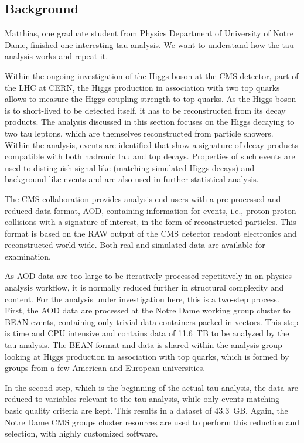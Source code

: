 \documentclass{acm_proc_article-sp}
\begin{document}
\subsection{Background}
Matthias, one graduate student from Physics Department of University of Notre Dame, finished one interesting tau analysis. We want to understand how the tau analysis works and repeat it. 

Within the ongoing investigation of the Higgs boson at the CMS
detector, part of the LHC at CERN, the Higgs production in association
with two top quarks allows to measure the Higgs coupling strength to
top quarks.  As the Higgs boson is to short-lived to be detected
itself, it has to be reconstructed from its decay products.  The
analysis discussed in this section focuses on the Higgs decaying to
two tau leptons, which are themselves reconstructed from particle
showers.  Within the analysis, events are identified that show a
signature of decay products compatible with both hadronic tau and top
decays.  Properties of such events are used to distinguish signal-like
(matching simulated Higgs decays) and background-like events and are
also used in further statistical analysis.

The CMS collaboration provides analysis end-users with a pre-processed
and reduced data format, AOD, containing information for events, i.e.,
proton-proton collisions with a signature of interest, in the form of
reconstructed particles.  This format is based on the RAW output of
the CMS detector readout electronics and reconstructed world-wide.
Both real and simulated data are available for examination.

As AOD data are too large to be iteratively processed repetitively in
an physics analysis workflow, it is normally reduced further in
structural complexity and content.  For the analysis under
investigation here, this is a two-step process.  First, the AOD data
are processed at the Notre Dame working group cluster to BEAN events,
containing only trivial data containers packed in vectors.  This step
is time and CPU intensive and contains data of \SI{11.6}{TB} to be
analyzed by the tau analysis.  The BEAN format and data is shared
within the analysis group looking at Higgs production in association
with top quarks, which is formed by groups from a few American and
European universities.

In the second step, which is the beginning of the actual tau analysis,
the data are reduced to variables relevant to the tau analysis, while
only events matching basic quality criteria are kept.  This results in
a dataset of \SI{43.3}{GB}.  Again, the Notre Dame CMS groups cluster
resources are used to perform this reduction and selection, with
highly customized software.
\end{document}
